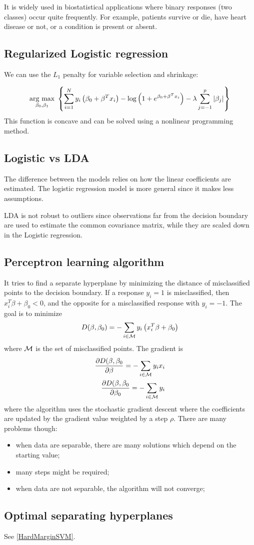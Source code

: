 It is widely used in biostatistical applications where binary responses (two classes) occur quite frequently. For example, patients survive or die, have heart disease or not, or a condition is present or absent.

\subsection{Regularized Logistic regression}
We can use the $L_1$ penalty for variable selection and shrinkage:

\begin{equation}
\underset{\beta_0,\beta_1}{\operatorname{arg}\,\operatorname{max}}\; \left\lbrace \sum_{i=1}^N y_i\left(  \beta_0 + \beta^Tx_i\right) -\log \left( 1+e^{\beta_0 + \beta^T x_i}\right) -\lambda \sum_{j=-1}^p |\beta_j|\right\rbrace
\end{equation}
This function is concave and can be solved using a nonlinear programming method.
\subsection{Logistic vs LDA}
The difference between the models relies on how the linear coefficients are estimated. The logistic regression model is more general since it makes less assumptions.

LDA is not robust to outliers since observations far from the decision boundary are used to estimate the common covariance matrix, while they are scaled down in the Logistic regression.

\subsection{Perceptron learning algorithm}
It tries to find a separate hyperplane by minimizing the distance of misclassified points to the decision boundary. If a response $y_i = 1$ is misclassified, then $x^T_i \beta + \beta_0 < 0$, and the opposite for a misclassified response with $y_i = -1$. The goal is to minimize
\begin{equation}
D(\beta, \beta_0) = - \sum_{i\in\CMcal{M}} y_i\left(x_i^T\beta + \beta_0\right)
\end{equation}
where $\CMcal{M}$ is the set of misclassified points.
The gradient is
\begin{align}
\frac{\partial D(\beta,\beta_0}{\partial \beta} = -\sum_{i\in\CMcal{M}}y_ix_i \\
\frac{\partial D(\beta,\beta_0}{\partial \beta_0} = -\sum_{i\in\CMcal{M}} y_i
\end{align}
where the algorithm uses the stochastic gradient descent where the coefficients are updated by the gradient value weighted by a step $\rho$. There are many problems though:
\begin{itemize}
\item when data are separable, there are many solutions which depend on the starting value;
\item many steps might be required;
\item when data are not separable, the algorithm will not converge;
\end{itemize}

\subsection{Optimal separating hyperplanes}
\label{OSH}
See \autoref{HardMarginSVM}.